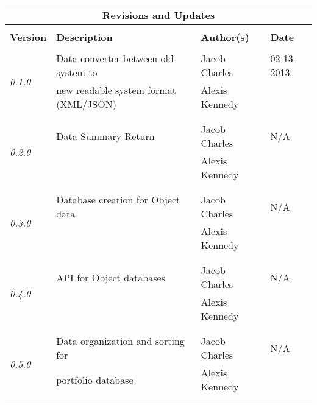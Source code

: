 \documentclass[]{article}
\begin{document}
	\begin{table} \centering
		\begin{tabular}{|l|l|l|l|}
			
			\multicolumn{4}{c}{\LARGE \textbf{Revisions and Updates}} \\
				
			\hline
			& & & \\
			\textbf{Version} & \textbf{Description} & \textbf{Author(s)} & \textbf{Date} \\ 
			\hline
				
			\multirow{4}{*}{\emph{0.1.0}} 
				
			& & & \\
			& Data converter between old system to & Jacob Charles & 02-13-2013 \\
			& new readable system format (XML/JSON) & Alexis Kennedy & \\
			& & & \\
			\hline
	
			\multirow{4}{*}{\emph{0.2.0}}
				
			& & & \\
			& Data Summary Return & Jacob Charles & N/A \\
			& & Alexis Kennedy & \\
			& & & \\
			\hline
				
			\multirow{4}{*}{\emph{0.3.0}} 
				
			& & & \\
			& Database creation for Object data & Jacob Charles & N/A \\
			& & Alexis Kennedy & \\
			& & & \\
			\hline
				
			\multirow{4}{*}{\emph{0.4.0}} 

			& & & \\
			& API for Object databases & Jacob Charles & N/A \\
			& & Alexis Kennedy & \\
			& & & \\
			\hline
				
			\multirow{4}{*}{\emph{0.5.0}} 
				
			& & & \\
			& Data organization and sorting for & Jacob Charles & N/A \\
			& portfolio database & Alexis Kennedy & \\
			& & & \\
			\hline


\end{tabular}
\end{table}
\end{document}
